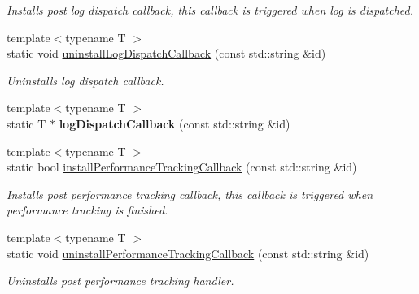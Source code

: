 \begin{DoxyCompactItemize}
\begin{DoxyCompactList}\small\item\em Installs post log dispatch callback, this callback is triggered when log is dispatched. \end{DoxyCompactList}\item 
\mbox{\label{classel_1_1_helpers_ac94b44cc8d399a5842703126478300d7}} 
{\footnotesize template$<$typename T $>$ }\\static void \hyperlink{classel_1_1_helpers_ac94b44cc8d399a5842703126478300d7}{uninstall\+Log\+Dispatch\+Callback} (const std\+::string \&id)
\begin{DoxyCompactList}\small\item\em Uninstalls log dispatch callback. \end{DoxyCompactList}\item 
\mbox{\label{classel_1_1_helpers_aa01d59ca141bc75c4fdd78a34234611b}} 
{\footnotesize template$<$typename T $>$ }\\static T $\ast$ {\bfseries log\+Dispatch\+Callback} (const std\+::string \&id)
\item 
\mbox{\label{classel_1_1_helpers_a93e2727d3a7a5c06ccc41a2ae7fe1835}} 
{\footnotesize template$<$typename T $>$ }\\static bool \hyperlink{classel_1_1_helpers_a93e2727d3a7a5c06ccc41a2ae7fe1835}{install\+Performance\+Tracking\+Callback} (const std\+::string \&id)
\begin{DoxyCompactList}\small\item\em Installs post performance tracking callback, this callback is triggered when performance tracking is finished. \end{DoxyCompactList}\item 
\mbox{\label{classel_1_1_helpers_af1c5a4951991179dca4879ba05fb67a6}} 
{\footnotesize template$<$typename T $>$ }\\static void \hyperlink{classel_1_1_helpers_af1c5a4951991179dca4879ba05fb67a6}{uninstall\+Performance\+Tracking\+Callback} (const std\+::string \&id)
\begin{DoxyCompactList}\small\item\em Uninstalls post performance tracking handler. \end{DoxyCompactList}\item 

\end{DoxyCompactItemize}

